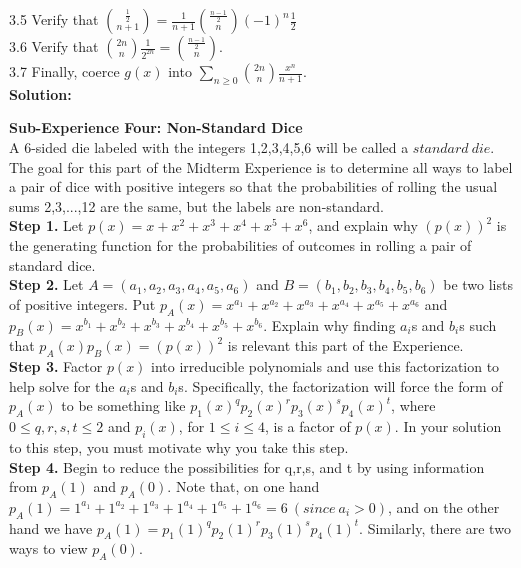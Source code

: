 \documentclass[10pt,a4paper]{report}
\begin{document}
	3.5 Verify that $\binom{\frac{1}{2}}{n+1} = \frac{1}{n+1}\binom{\frac{n-1}{2}}{n}(-1)^n\frac{1}{2}$\\
	3.6 Verify that $\binom{2n}{n}\frac{1}{2^{2n}} = \binom{\frac{n-1}{2}}{n}$.\\
	3.7 Finally, coerce $g(x)$ into $\sum_{n\geq0}^{}\binom{2n}{n}\frac{x^n}{n+1}$.\\
	\newline
	\textbf{Solution: }\\
	\newline



	\textbf{Sub-Experience Four: Non-Standard Dice}\\
	A 6-sided die labeled with the integers 1,2,3,4,5,6 will be called a $standard\ die$.  The goal for this part of the Midterm Experience is to determine all ways to label a pair of dice with positive integers so that the probabilities of rolling the usual sums 2,3,...,12 are the same, but the labels are non-standard.\\
	\newline
	\textbf{Step 1.} Let $p(x) = x + x^2 + x^3 + x^4 + x^5 + x^6$, and explain why $(p(x))^2$ is the generating function for the probabilities of outcomes in rolling a pair of standard dice.\\
	\newline
	\textbf{Step 2.} Let $A = (a_1,a_2,a_3,a_4,a_5,a_6)$ and $B = (b_1,b_2,b_3,b_4,b_5,b_6)$ be two lists of positive integers.  Put $p_A(x) = x^{a_1} + x^{a_2} + x^{a_3} + x^{a_4} + x^{a_5} + x^{a_6}$ and $p_B(x) = x^{b_1} + x^{b_2} + x^{b_3} + x^{b_4} + x^{b_5} + x^{b_6}$. Explain why finding $a_i$s and $b_i$s such that $p_A(x)p_B(x) = (p(x))^2$ is relevant this part of the Experience.\\
	\newline
	\textbf{Step 3.} Factor $p(x)$ into irreducible polynomials and use this factorization to help solve for the $a_i$s and $b_i$s.  Specifically, the factorization will force the form of $p_A(x)$ to be something like $p_1(x)^qp_2(x)^rp_3(x)^sp_4(x)^t$, where $0\leq q,r,s,t\leq2$ and $p_i(x)$, for $ 1\leq i\leq4$, is a factor of $p(x)$.  In your solution to this step, you must motivate why you take this step.\\
	\newline
	\textbf{Step 4.} Begin to reduce the possibilities for q,r,s, and t by using information from $p_A(1)$ and $p_A(0)$.  Note that, on one hand $p_A(1) = 1^{a_1} + 1^{a_2} + 1^{a_3} + 1^{a_4} + 1^{a_5} + 1^{a_6} = 6\ (since\ a_i > 0)$, and on the other hand we have $p_A(1) = p_1(1)^qp_2(1)^rp_3(1)^sp_4(1)^t$.  Similarly, there are two ways to view $p_A(0)$.\\
\end{document}
